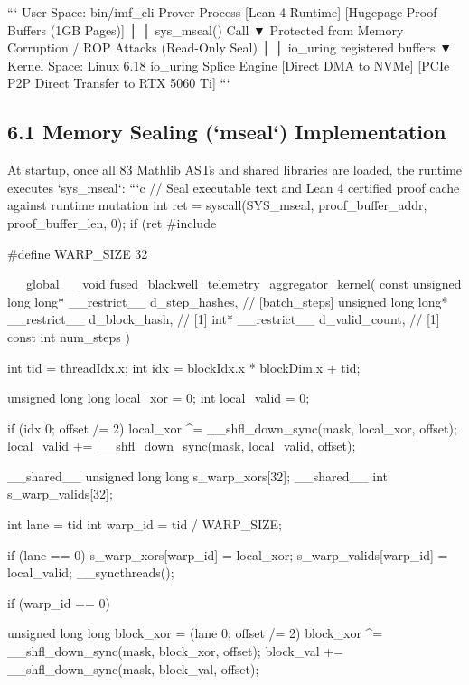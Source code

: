 \documentclass[11pt,twoside,openright]{amsbook}
\begin{document}
{{```
   User Space: bin/imf_cli Prover Process
   [Lean 4 Runtime]    [Hugepage Proof Buffers (1GB Pages)]
                                  │
                                  │  sys_mseal() Call
                                  ▼
   Protected from Memory Corruption / ROP Attacks (Read-Only Seal)
                                  │
                                  │  io_uring registered buffers
                                  ▼
   Kernel Space: Linux 6.18 io_uring Splice Engine
   [Direct DMA to NVMe]    [PCIe P2P Direct Transfer to RTX 5060 Ti]
```

\subsection{6.1 Memory Sealing (`mseal`) Implementation}
At startup, once all 83 Mathlib ASTs and shared libraries are loaded, the runtime executes `sys_mseal`:
```c
// Seal executable text and Lean 4 certified proof cache against runtime mutation
int ret = syscall(SYS_mseal, proof_buffer_addr, proof_buffer_len, 0);
if (ret 
#include 

#define WARP_SIZE 32

__global__ void fused_blackwell_telemetry_aggregator_kernel(
    const unsigned long long* __restrict__ d_step_hashes, // [batch_steps]
    unsigned long long* __restrict__ d_block_hash,         // [1]
    int* __restrict__ d_valid_count,                       // [1]
    const int num_steps
) {
    int tid = threadIdx.x;
    int idx = blockIdx.x * blockDim.x + tid;

    unsigned long long local_xor = 0;
    int local_valid = 0;

    if (idx  0; offset /= 2) {
        local_xor ^= __shfl_down_sync(mask, local_xor, offset);
        local_valid += __shfl_down_sync(mask, local_valid, offset);
    }

    __shared__ unsigned long long s_warp_xors[32];
    __shared__ int s_warp_valids[32];

    int lane = tid %
    int warp_id = tid / WARP_SIZE;

    if (lane == 0) {
        s_warp_xors[warp_id] = local_xor;
        s_warp_valids[warp_id] = local_valid;
    }
    __syncthreads();

    if (warp_id == 0) {
        unsigned long long block_xor = (lane  0; offset /= 2) {
            block_xor ^= __shfl_down_sync(mask, block_xor, offset);
            block_val += __shfl_down_sync(mask, block_val, offset);
        }

}}}}
\end{document}
